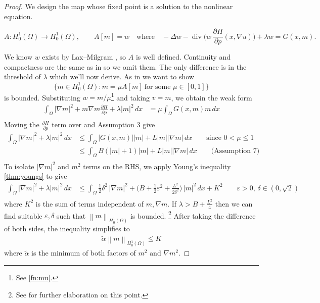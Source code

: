 \documentclass[11pt]{article}
\numberwithin{equation}{section}
\theoremstyle{definition}
\theoremstyle{remark}
\DeclareMathOperator{\diver}{div}
\newcommand{\Honez}{H_0^1(\Omega)}
\newcommand{\Hp}{\frac{\partial H}{\partial p}}
\newcommand{\norm}[1]{\left\lVert #1 \right\rVert}
\begin{document}
\begin{proof}
  We design the map whose fixed point is a solution to the nonlinear equation. 

  \[A:\Honez\to\Honez,\qquad A[m]=w \quad\text{where}\quad -\Delta w -\diver\!\bigl(w\,\Hp(x,\nabla u)\bigr)+\lambda w = G(x,m).\]

  We know $w$ exists by Lax--Milgram , so $A$ is well defined.
  Continuity and compactness are the same as in  so we omit them.
  The only difference is in the threshold of $\lambda$ which we'll now derive. As in  we want to show
  \[\{m\in \Honez: m=\mu A[m]\ \text{for some } \mu \in [0,1]\}\]
  is bounded.
  Substituting $w=m/\mu$\footnote{See \ref{fn:mu}.} and taking $v=m$, we obtain the weak form
  \begin{align*}
  \int_\Omega |\nabla m|^2 + m \nabla m \Hp + \lambda |m|^2\,dx
  &= \mu\int_\Omega G(x,m)m \,dx\\
  \end{align*}
  Moving the $\Hp$ term over and Assumption 3 give
  \begin{align*}
  \int_\Omega |\nabla m|^2 + \lambda |m|^2\,dx
  &\le \int_\Omega |G(x,m)||m| + L|m||\nabla m|\,dx \qquad \text{since } 0<\mu \le 1\\
  &\le \int_\Omega B(|m|+1)|m| + L|m||\nabla m|\,dx \qquad \text{(Assumption 7)}\\
  \end{align*}
  To isolate $|\nabla m|^2$ and $m^2$ terms on the RHS, we apply Young's inequality \ref{thm:youngs} to give\\
  \begin{align*}
  \int_\Omega |\nabla m|^2 + \lambda |m|^2\,dx
  &\le \int_\Omega \frac12\delta ^2\,|\nabla m|^2 + \bigl(B+\frac12 \varepsilon^2 +\frac{L^2}{2\delta ^2}\bigr)\,|m|^2 \,dx  + K^2
  \qquad \varepsilon >0, \,\delta \in (0, \sqrt{2})\\[0.9em]
  \end{align*}
  where $K^2$ is the sum of terms independent of $m, \nabla m$.
  If $\lambda > B + \frac{L^2}{4}$ then we can find suitable $\varepsilon, \delta$ such that $\norm{m}_{\Honez}$ is bounded. \footnote{See  for further elaboration on this point.}
  After taking the difference of both sides, the inequality simplifies to 
  \begin{align*}
    \tilde{\alpha} \norm{m}_{\Honez} \le K
  \end{align*}
  where $\tilde{\alpha}$ is the minimum of both factors of $m^2\text{ and } \nabla m^2$. 
\end{proof}
\end{document}
